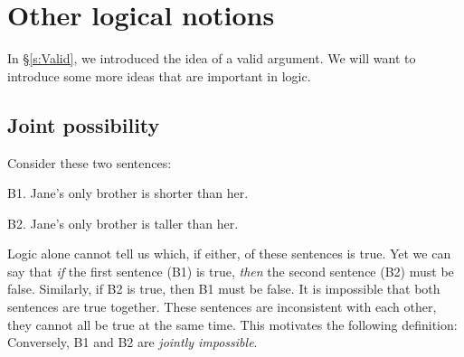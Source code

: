 \chapter{Other logical notions}\label{s:BasicNotions}

In \S\ref{s:Valid}, we introduced the idea of a valid argument. We will want to introduce some more ideas that are important in logic.



\section{Joint possibility}

Consider these two sentences:
	\begin{ebullet}
		\item[B1.] Jane's only brother is shorter than her.
		\item[B2.] Jane's only brother is taller than her.
	\end{ebullet}
Logic alone cannot tell us which, if either, of these sentences is true. Yet we can say that \emph{if} the first sentence (B1) is true, \emph{then} the second sentence (B2) must be false. Similarly, if B2 is true, then B1 must be false. It is impossible that both sentences are true together. These sentences are inconsistent with each other, they cannot all be true at the same time. This motivates the following definition:
Conversely, B1 and B2 are \emph{jointly impossible}.

